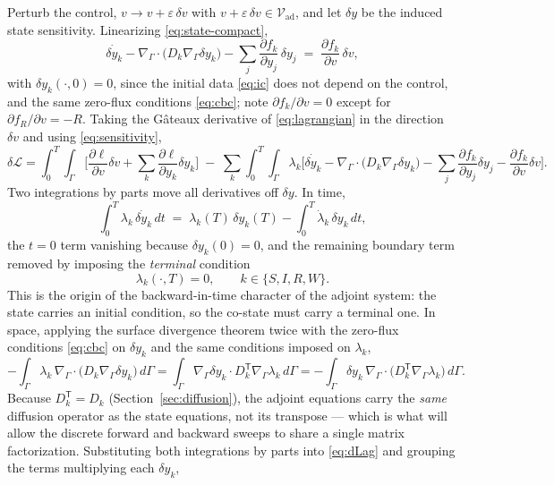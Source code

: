 \documentclass[11pt]{article}
\newcommand{\Grad}{\nabla_\Gamma}
\newcommand{\Div}{\nabla_\Gamma\cdot}
\newcommand{\Vad}{\mathcal{V}_{\mathrm{ad}}}
\newcommand{\Lag}{\mathcal{L}}
\begin{document}
Perturb the control, $v \to v + \varepsilon\,\delta v$ with $v+\varepsilon\,\delta v\in\Vad$, and let $\delta y$ be the induced state sensitivity. Linearizing \eqref{eq:state-compact},
\begin{equation}
\dot{\delta y_k} - \Div\big(D_k\Grad \delta y_k\big) - \sum_j \frac{\partial f_k}{\partial y_j}\,\delta y_j \;=\; \frac{\partial f_k}{\partial v}\,\delta v,
\label{eq:sensitivity}
\end{equation}
with $\delta y_k(\cdot,0)=0$, since the initial data \eqref{eq:ic} does not depend on the control, and the same zero-flux conditions \eqref{eq:cbc}; note $\partial f_k/\partial v = 0$ except for $\partial f_R/\partial v = -R$. Taking the G\^ateaux derivative of \eqref{eq:lagrangian} in the direction $\delta v$ and using \eqref{eq:sensitivity},
\begin{equation}
\delta\Lag = \int_0^T\!\!\int_\Gamma\Big[\frac{\partial \ell}{\partial v}\delta v + \sum_k\frac{\partial \ell}{\partial y_k}\delta y_k\Big]
\;-\;\sum_k\int_0^T\!\!\int_\Gamma\lambda_k\Big[\dot{\delta y_k} - \Div\big(D_k\Grad\delta y_k\big) - \sum_j\frac{\partial f_k}{\partial y_j}\delta y_j - \frac{\partial f_k}{\partial v}\delta v\Big].
\label{eq:dLag}
\end{equation}
Two integrations by parts move all derivatives off $\delta y$. In time,
\[
\int_0^T \lambda_k\,\dot{\delta y_k}\,dt \;=\; \lambda_k(T)\,\delta y_k(T) - \int_0^T \dot\lambda_k\,\delta y_k\,dt,
\]
the $t=0$ term vanishing because $\delta y_k(0)=0$, and the remaining boundary term removed by imposing the \emph{terminal} condition
\begin{equation}
\lambda_k(\cdot,T) = 0, \qquad k\in\{S,I,R,W\}.
\label{eq:terminal}
\end{equation}
This is the origin of the backward-in-time character of the adjoint system: the state carries an initial condition, so the co-state must carry a terminal one. In space, applying the surface divergence theorem twice with the zero-flux conditions \eqref{eq:cbc} on $\delta y_k$ and the same conditions imposed on $\lambda_k$,
\[
-\int_\Gamma \lambda_k\,\Div\big(D_k\Grad\delta y_k\big)\,d\Gamma
= \int_\Gamma \Grad \delta y_k\cdot D_k^{\mathsf T}\Grad\lambda_k \,d\Gamma
= -\int_\Gamma \delta y_k\,\Div\big(D_k^{\mathsf T}\Grad\lambda_k\big)\,d\Gamma.
\]
Because $D_k^{\mathsf T}=D_k$ (Section~\ref{sec:diffusion}), the adjoint equations carry the \emph{same} diffusion operator as the state equations, not its transpose --- which is what will allow the discrete forward and backward sweeps to share a single matrix factorization. Substituting both integrations by parts into \eqref{eq:dLag} and grouping the terms multiplying each $\delta y_k$,
\end{document}
